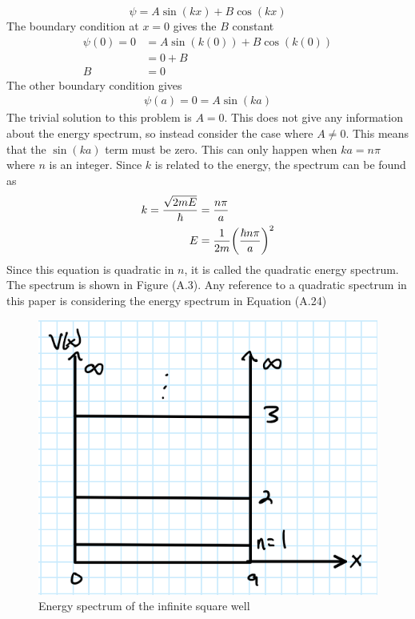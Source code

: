 \begin{equation}
    \psi=A\sin(kx)+B\cos(kx)
\end{equation}
The boundary condition at $x=0$ gives the $B$ constant 
\begin{align}
    \psi(0)=0&=A\sin(k(0))+B\cos(k(0))\\
    &=0+B\\
    B&=0
\end{align}
The other boundary condition gives
\begin{align}
    \psi(a)=0=A\sin(ka)
\end{align}
The trivial solution to this problem is $A=0$. This does not give any information about the energy spectrum, so instead consider the case where $A\neq 0$. This means that the $\sin(ka)$ term must be zero. This can only happen when $ka=n\pi$ where $n$ is an integer. Since $k$ is related to the energy, the spectrum can be found as
\begin{align}
    k=\frac{\sqrt{2mE}}{\hbar}&=\frac{n\pi}{a}\\
    E&=\frac{1}{2m} \qty(\frac{\hbar n\pi}{a})^2 
\end{align}
Since this equation is quadratic in $n$, it is called the quadratic energy spectrum. The spectrum is shown in Figure (A.3). Any reference to a quadratic spectrum in this paper is considering the energy spectrum in Equation (A.24)
\begin{figure}
    \centering
    \includegraphics[scale=0.5]{figures/pdf/infsqspec.PNG}
    \caption{Energy spectrum of the infinite square well}
    \label{fig:Energy spectrum of the infinite square well}
\end{figure}
